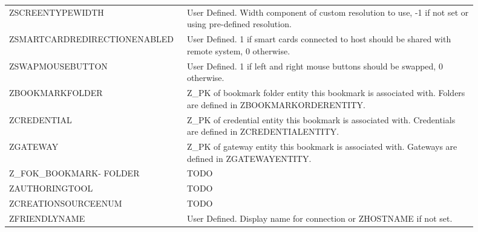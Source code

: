 \documentclass[journal]{IEEEtran}
\begin{document}
\begin{table}[h!]
\begin{tabular}{p{0.3\linewidth} | p{0.6\linewidth}}
ZSCREENTYPEWIDTH              & User Defined. Width component of custom resolution to use, -1 if not set or using pre-defined resolution.                                                                                                                                                                                           \\
ZSMARTCARDREDIRECTIONENABLED  & User Defined. 1 if smart cards connected to host should be shared with remote system, 0 otherwise.                                                                                             \\
ZSWAPMOUSEBUTTON              & User Defined. 1 if left and right mouse buttons should be swapped, 0 otherwise.                                                                                                                \\
ZBOOKMARKFOLDER               & Z\_PK of bookmark folder entity this bookmark is associated with. Folders are defined in ZBOOKMARKORDERENTITY.                                                                                 \\
ZCREDENTIAL                   & Z\_PK of credential entity this bookmark is associated with. Credentials are defined in ZCREDENTIALENTITY.                                                                                     \\
ZGATEWAY                      & Z\_PK of gateway entity this bookmark is associated with. Gateways are defined in ZGATEWAYENTITY.                                                                                              \\
Z\_FOK\_BOOKMARK- FOLDER        & TODO                                                                                                                                                                                           \\
ZAUTHORINGTOOL                & TODO                                                                                                                                                                                           \\
ZCREATIONSOURCEENUM           & TODO                                                                                                                                                                                           \\
ZFRIENDLYNAME                 & User Defined. Display name for connection or ZHOSTNAME if not set.                                                                                                                                                                                           \\

\end{tabular}
\end{table}
\end{document}
